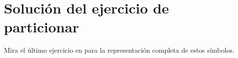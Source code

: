\chapter{Solución del ejercicio de particionar}\label{s:chunking}

Mira el último ejercicio en  para la representación completa de estos símbolos.

